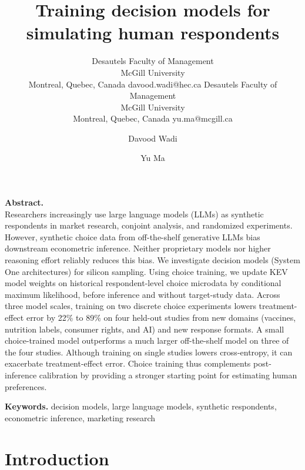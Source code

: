 \documentclass[
  11pt,
  letterpaper,
]{article}
\author{%
    \aclauthor{Davood Wadi}
      {Desautels Faculty of Management\\ McGill University\\ Montreal, Quebec, Canada}
      {davood.wadi@hec.ca}%
    \hspace{3em}%
    \aclauthor{Yu Ma}
      {Desautels Faculty of Management\\ McGill University\\ Montreal, Quebec, Canada}
      {yu.ma@mcgill.ca}%
  }%
\title{Training decision models for simulating human respondents}
\author{Davood Wadi \and Yu Ma}
\date{}
\begin{document}
\maketitle


\textbf{Abstract.}\\
Researchers increasingly use large language models (LLMs) as synthetic
respondents in market research, conjoint analysis, and randomized
experiments. However, synthetic choice data from off-the-shelf
generative LLMs bias downstream econometric inference. Neither
proprietary models nor higher reasoning effort reliably reduces this
bias. We investigate decision models (System One architectures) for
silicon sampling. Using choice training, we update KEV model weights on
historical respondent-level choice microdata by conditional maximum
likelihood, before inference and without target-study data. Across three
model scales, training on two discrete choice experiments lowers
treatment-effect error by 22\% to 89\% on four held-out studies from new
domains (vaccines, nutrition labels, consumer rights, and AI) and new
response formats. A small choice-trained model outperforms a much larger
off-the-shelf model on three of the four studies. Although training on
single studies lowers cross-entropy, it can exacerbate treatment-effect
error. Choice training thus complements post-inference calibration by
providing a stronger starting point for estimating human preferences.

\textbf{Keywords.} decision models, large language models, synthetic
respondents, econometric inference, marketing research

\section{Introduction}\label{sec-intro}
\end{document}
